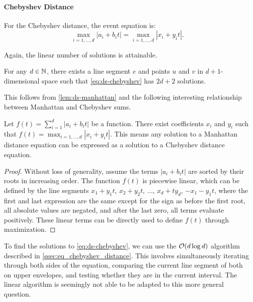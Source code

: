 \paragraph{Chebyshev Distance}
For the Chebyshev distance, the event equation is:
\begin{equation}\label{eq:ds-chebyshev}
	\max_{i=1, \dots, d} |a_i + b_i t| = \max_{i=1, \dots, d} |x_i + y_i t|.
\end{equation}

Again, the linear number of solutions is attainable.

\begin{lemma}
	For any \(d \in \mathbb{N}\), there exists a line segment \(e\) and points \(u\) and \(v\) in \(d+1\)-dimensional space such that \cref{eq:ds-chebyshev} has \(2d + 2\) solutions. 
\end{lemma}

This follows from \cref{lem:ds-manhattan} and the following interesting relationship between Manhattan and Chebyshev sums.

\begin{lemma}\label{lem:manhattan-is-chebyshev}
	Let \(f(t) = \sum_{i=1}^d |a_i + b_i t|\) be a function. There exist coefficients \(x_i\) and \(y_i\) such that \newline \(f(t) = \max_{i=1, \dots, d} |x_i + y_i t|\). This means any solution to a Manhattan distance equation can be expressed as a solution to a Chebyshev distance equation.
\end{lemma}

\begin{proof}
	Without loss of generality, assume the terms \(|a_i + b_i t|\) are sorted by their roots in increasing order. The function \(f(t)\) is piecewise linear, which can be defined by the line segments \(x_1 + y_1 t\), \(x_2 + y_2 t\), \(\dots\), \(x_d + t y_d\), \(-x_1 - y_1 t\), where the first and last expression are the same except for the sign as before the first root, all absolute values are negated, and after the last zero, all terms evaluate positively. These linear terms can be directly used to define \(f(t)\) through maximization. 
\end{proof}

To find the solutions to \cref{eq:ds-chebyshev}, we can use the \(\mathcal{O}(d \log d)\) algorithm described in \cref{ssec:eq_chebyshev_distance}. This involves simultaneously iterating through both sides of the equation, comparing the current line segment of both on upper envelopes, and testing whether they are in the current interval. The linear algorithm is seemingly not able to be adapted to this more general question.
